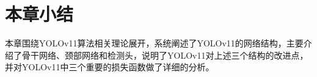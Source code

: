 


\section{本章小结}
本章围绕YOLOv11算法相关理论展开，系统阐述了YOLOv11的网络结构，主要介绍了骨干网络、颈部网络和检测头，说明了YOLOv11对上述三个结构的改进点，并对YOLOv11中三个重要的损失函数做了详细的分析。



